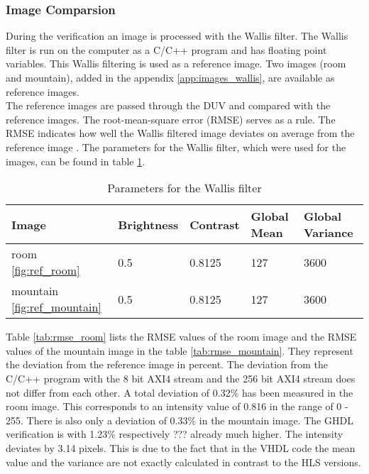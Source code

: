 \subsubsection*{Image Comparsion}
During the verification an image is processed with the Wallis filter. The Wallis filter is run on the computer as a C/C++ program and has floating point variables. This Wallis filtering is used as a reference image. Two images (room and mountain), added in the appendix \ref{app:images_wallis}, are available as reference images. \\
The reference images are passed through the DUV and compared with the reference images. The root-mean-square error (RMSE) serves as a rule. The RMSE indicates how well the  Wallis filtered image deviates on average from the reference image \cite{rmse}. The parameters for the Wallis filter, which were used for the images, can be found in table \ref{tab:parameter}.

\begin{table}[tb!]
    \centering
    \begin{tabular}{l l l l l}
        \toprule
        Image & Brightness & Contrast & Global Mean & Global Variance \\
        \midrule
        room \ref{fig:ref_room} & 0.5 & 0.8125 & 127 & 3600 \\
        mountain \ref{fig:ref_mountain} & 0.5 & 0.8125 & 127 & 3600 \\
        \bottomrule
    \end{tabular}
    \caption{Parameters for the Wallis filter}
    \label{tab:parameter}
\end{table}



Table \ref{tab:rmse_room} lists the RMSE values of the room image and the RMSE values of the mountain image in the table \ref{tab:rmse_mountain}. They represent the deviation from the reference image in percent. The deviation from the C/C++ program with the 8 bit AXI4 stream and the 256 bit AXI4 stream does not differ from each other. A total deviation of 0.32\% has been measured in the room image. This corresponds to an intensity value of 0.816 in the range of 0 - 255. There is also only a deviation of 0.33\% in the mountain image. The GHDL verification is with 1.23\% respectively ??? already much higher. The intensity deviates by 3.14 pixels. This is due to the fact that in the VHDL code the mean value and the variance are not exactly calculated in contrast to the HLS versions. 

